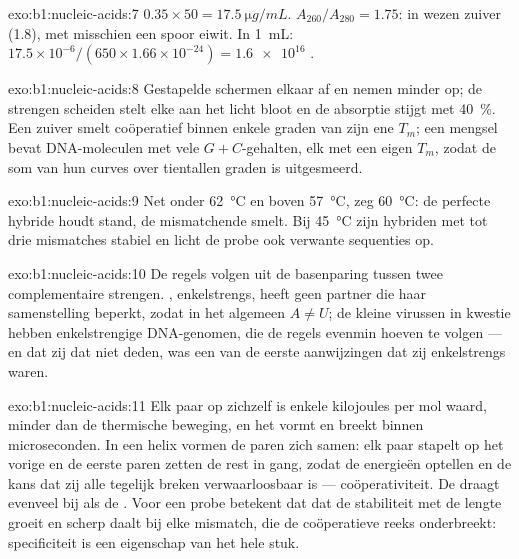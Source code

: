 \begin{solution}{exo:b1:nucleic-acids:7}
$0.35\times 50 = \qty{17.5}{\micro g/mL}$. $A_{260}/A_{280} = 1.75$: in wezen
zuiver  (1.8), met misschien een spoor eiwit. In \qty{1}{mL}:
$17.5\times 10^{-6}/(650\times 1.66\times 10^{-24}) =
\num{1.6e16}$ .
\end{solution}

\begin{solution}{exo:b1:nucleic-acids:8}
Gestapelde  schermen elkaar af en nemen minder op; de strengen scheiden stelt
elke  aan het licht bloot en de absorptie stijgt met \qty{40}{\%}. Een zuiver
 smelt coöperatief binnen enkele graden van zijn ene $T_m$; een mengsel bevat
DNA-moleculen met vele $G + C$-gehalten, elk met een eigen $T_m$, zodat de som van
hun curves over tientallen graden is uitgesmeerd.
\end{solution}

\begin{solution}{exo:b1:nucleic-acids:9}
Net onder \qty{62}{\celsius} en boven \qty{57}{\celsius}, zeg
\qty{60}{\celsius}: de perfecte hybride houdt stand, de mismatchende smelt. Bij
\qty{45}{\celsius} zijn hybriden met tot drie mismatches stabiel en licht de probe
ook verwante sequenties op.
\end{solution}

\begin{solution}{exo:b1:nucleic-acids:10}
De regels volgen uit de basenparing tussen twee complementaire strengen. ,
enkelstrengs, heeft geen partner die haar samenstelling beperkt, zodat in het
algemeen $A \neq U$; de kleine virussen in kwestie hebben enkelstrengige
DNA-genomen, die de regels evenmin hoeven te volgen --- en dat zij dat niet deden,
was een van de eerste aanwijzingen dat zij enkelstrengs waren.
\end{solution}

\begin{solution}{exo:b1:nucleic-acids:11}
Elk paar op zichzelf is enkele kilojoules per mol waard, minder dan de thermische
beweging, en het vormt en breekt binnen microseconden. In een helix vormen de
paren zich samen: elk paar stapelt op het vorige en de eerste paren zetten de rest
in gang, zodat de energieën optellen en de kans dat zij alle tegelijk breken
verwaarloosbaar is --- coöperativiteit. De  draagt evenveel bij als de
. Voor een probe betekent dat dat de stabiliteit met de lengte
groeit en scherp daalt bij elke mismatch, die de coöperatieve reeks onderbreekt:
specificiteit is een eigenschap van het hele stuk.
\end{solution}

